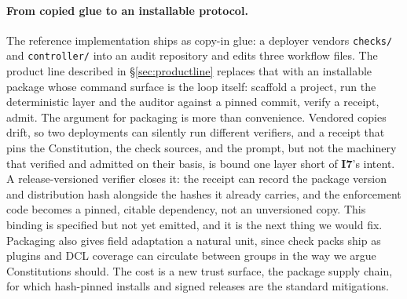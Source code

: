 \documentclass[11pt,letterpaper]{article}
\newcommand{\invariant}[1]{\textbf{I#1}}
\begin{document}
\paragraph{From copied glue to an installable protocol.} The reference implementation ships as copy-in glue: a deployer vendors \texttt{checks/} and \texttt{controller/} into an audit repository and edits three workflow files. The product line described in \S\ref{sec:productline} replaces that with an installable package whose command surface is the loop itself: scaffold a project, run the deterministic layer and the auditor against a pinned commit, verify a receipt, admit. The argument for packaging is more than convenience. Vendored copies drift, so two deployments can silently run different verifiers, and a receipt that pins the Constitution, the check sources, and the prompt, but not the machinery that verified and admitted on their basis, is bound one layer short of \invariant{7}'s intent. A release-versioned verifier closes it: the receipt can record the package version and distribution hash alongside the hashes it already carries, and the enforcement code becomes a pinned, citable dependency, not an unversioned copy. This binding is specified but not yet emitted, and it is the next thing we would fix. Packaging also gives field adaptation a natural unit, since check packs ship as plugins and DCL coverage can circulate between groups in the way we argue Constitutions should. The cost is a new trust surface, the package supply chain, for which hash-pinned installs and signed releases are the standard mitigations.
\end{document}
